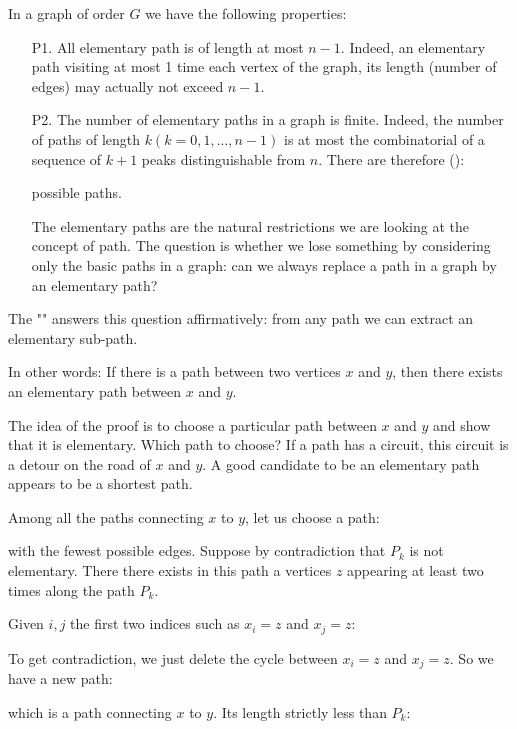 {\begin{enumerate}
	 In a graph of order $G$ we have the following properties:
	 \begin{enumerate}
	 	\item[P1.] All elementary path is of length at most $n-1$. Indeed, an elementary path visiting at most 1 time each vertex of the graph, its length (number of edges) may actually not exceed $n-1$.
	 	
	 	\item[P2.] The number of elementary paths in a graph is finite. Indeed, the number of paths of length $k(k=0,1,...,n-1)$ is at most the combinatorial of a sequence of $k + 1$ peaks distinguishable from $n$. There are therefore ():
	 	
		possible paths.
		
		The elementary paths are the natural restrictions we are looking at the concept of path. The question is whether we lose something by considering only the basic paths in a graph: can we always replace a path in a graph by an elementary path?
	 \end{enumerate}
	 \begin{lemma}
	 The "" answers this question affirmatively: from any path we can extract an elementary sub-path.
	 
	 In other words: If there is a path between two vertices $x$ and $y$, then there exists an elementary path between $x$ and $y$.
	 \end{lemma}
	 \begin{dem}
	 The idea of the proof is to choose a particular path between $x$ and $y$ and show that it is elementary. Which path to choose? If a path has a circuit, this circuit is a detour on the road of $x$ and $y$. A good candidate to be an elementary path appears to be a shortest path.
	 
	 Among all the paths connecting $x$ to $y$, let us choose a path:
	 
	 with the fewest possible edges. Suppose by contradiction that $P_k$ is not elementary. There there exists in this path a vertices $z$ appearing at least two times along the path $P_k$.
	 
	 Given $i, j$ the first two indices such as $x_i=z$ and $x_j=z$:
	  
	 To get contradiction, we just delete the cycle between $x_i=z$ and $x_j=z$. So we have a new path:
	 
	 which is a path connecting $x$ to $y$. Its length strictly less than $P_k$: 
	  

\end{dem}
\end{enumerate}}
